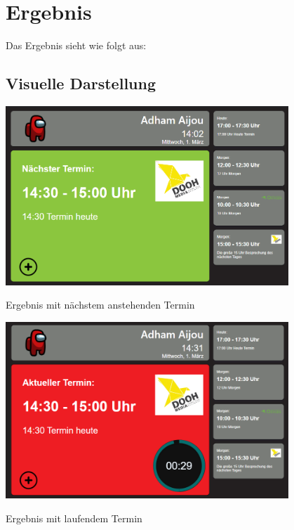 
\newpage
\section{Ergebnis}\label{sec:ergebnis}
Das Ergebnis sieht wie folgt aus:
\subsection{Visuelle Darstellung}\label{subsec:visuelle-darstellung}
\par\vspace{1cm}
    \centering
    \includegraphics[width=0.8\textwidth]{Bilder/Ergebnis}
    \caption{Ergebnis mit nächstem anstehenden Termin}
    \label{fig:Ergebnis mit nächstem anstehenden Termin}
\par\vspace{1cm}
\raggedright
\par\vspace{1cm}
    \centering
    \includegraphics[width=0.8\textwidth]{Bilder/Ergebnis_LaufenderTermin}
    \caption{Ergebnis mit laufendem Termin}
    \label{fig:Ergebnis mit laufendem Termin}
\par\vspace{1cm}
